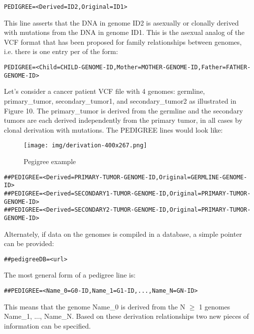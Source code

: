 \documentclass[8pt]{article}
\begin{document}
\begin{verbatim}
PEDIGREE=<Derived=ID2,Original=ID1>
\end{verbatim}

This line asserts that the DNA in genome ID2 is asexually or clonally derived with mutations from the DNA in genome ID1. This is the asexual analog of the VCF format that has been proposed for family relationships between genomes, i.e. there is one entry per of the form:

\begin{verbatim}
PEDIGREE=<Child=CHILD-GENOME-ID,Mother=MOTHER-GENOME-ID,Father=FATHER-GENOME-ID>
\end{verbatim}

Let's consider a cancer patient VCF file with 4 genomes: germline, primary\_tumor, secondary\_tumor1, and secondary\_tumor2 as illustrated in Figure 10. The primary\_tumor is derived from the germline and the secondary tumors are each derived independently from the primary tumor, in all cases by clonal derivation with mutations. The PEDIGREE lines would look like:

\begin{figure}[ht]
\centering
\texttt{[image: img/derivation-400x267.png]}
\caption{Pegigree example}
\end{figure}

\begin{verbatim}
##PEDIGREE=<Derived=PRIMARY-TUMOR-GENOME-ID,Original=GERMLINE-GENOME-ID>
##PEDIGREE=<Derived=SECONDARY1-TUMOR-GENOME-ID,Original=PRIMARY-TUMOR-GENOME-ID>
##PEDIGREE=<Derived=SECONDARY2-TUMOR-GENOME-ID,Original=PRIMARY-TUMOR-GENOME-ID>
\end{verbatim}

Alternately, if data on the genomes is compiled in a database, a simple pointer can be provided:

\begin{verbatim}
##pedigreeDB=<url>
\end{verbatim}

The most general form of a pedigree line is:

\begin{verbatim}
##PEDIGREE=<Name_0=G0-ID,Name_1=G1-ID,...,Name_N=GN-ID>
\end{verbatim}

This means that the genome Name\_0 is derived from the N $\ge$ 1 genomes Name\_1, ..., Name\_N. Based on these derivation relationships two new pieces of information can be specified.
\end{document}
